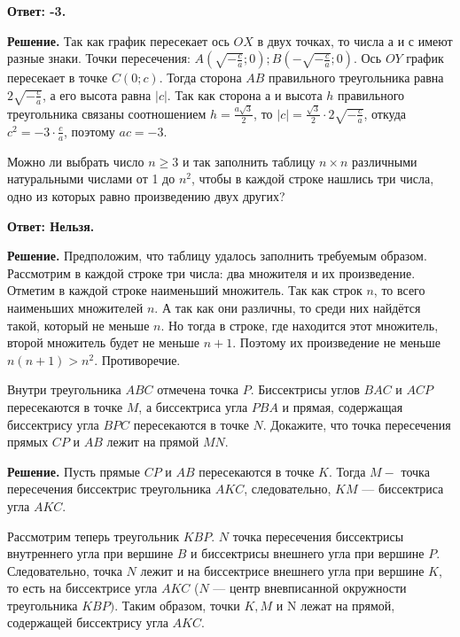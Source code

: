 \textbf{Ответ: -3.}

\textbf{Решение.}
Так как график пересекает ось $O X$ в двух точках, то числа а и с имеют разные знаки. Точки пересечения: $A\left(\sqrt{-\frac{c}{a}} ; 0\right) ; B\left(-\sqrt{-\frac{c}{a}} ; 0\right)$. Ось $OY$ график пересекает в точке $C(0 ; c)$. Тогда сторона $A B$ правильного треугольника равна $2 \sqrt{-\frac{c}{a}}$, а его высота равна $|c|$. Так как сторона а и высота $h$ правильного треугольника связаны соотношением $h=\frac{a \sqrt{3}}{2}$, то $|c|=\frac{\sqrt{3}}{2} \cdot 2 \sqrt{-\frac{c}{a}}$, откуда $c^2=-3 \cdot \frac{c}{a}$, поэтому $a c=-3$.

Можно ли выбрать число $n \geqslant 3$ и так заполнить таблицу $n \times n$ различными натуральными числами от 1 до $n^2$, чтобы в каждой строке нашлись три числа, одно из которых равно произведению двух других?

\textbf{Ответ: Нельзя.}

\textbf{Решение.}
Предположим, что таблицу удалось заполнить требуемым образом. Рассмотрим в каждой строке три числа: два множителя и их произведение. Отметим в каждой строке наименьший множитель. Так как строк $n$, то всего наименьших множителей $n$. А так как они различны, то среди них найдётся такой, который не меньше $n$. Но тогда в строке, где находится этот множитель, второй множитель будет не меньше $n+1$. Поэтому их произведение не меньше $n(n+1)>n^2$. Противоречие.

Внутри треугольника $A B C$ отмечена точка $P$. Биссектрисы углов $B A C$ и $A C P$ пересекаются в точке $M$, а биссектриса угла $P B A$ и прямая, содержащая биссектрису угла $B P C$ пересекаются в точке $N$. Докажите, что точка пересечения прямых $C P$ и $A B$ лежит на прямой $MN$.

\textbf{Решение.} 
Пусть прямые $C P$ и $A B$ пересекаются в точке $K$. Тогда $M-$ точка пересечения биссектрис треугольника $A K C$, следовательно, $K M$ --- биссектриса угла $A K C$.

Рассмотрим теперь треугольник $K B P$. $N$ точка пересечения биссектрисы внутреннего угла при вершине $B$ и биссектрисы внешнего угла при вершине $P$. Следовательно, точка $N$ лежит и на биссектрисе внешнего угла при вершине $K$, то есть на биссектрисе угла $A K C$ ($N$ --- центр вневписанной окружности треугольника $K B P)$. Таким образом, точки $K, M$ и N лежат на прямой, содержащей биссектрису угла $AKC$.